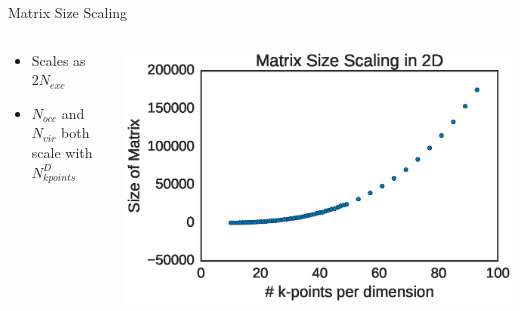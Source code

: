\documentclass[10pt]{beamer}
\begin{document}
{{{{{{{{{{{{{{{{{\begin{frame}{Matrix Size Scaling}
	\begin{columns}[c] %
		\begin{column}{.4\textwidth}
			\begin{itemize}
				\item {Scales as $2N_{exc}$}
				\item {$N_{occ}$ and $N_{vir}$ both scale with $N_{kpoints}^D$}
			\end{itemize}
		\end{column}
		\hfill
		\begin{column}{0.6\textwidth}
		    \begin{overprint}
			    \includegraphics[width=\linewidth]{../images/matscale.eps}

			\end{overprint}
		\end{column}
	\end{columns}
\end{frame}


}}}}}}}}}}}}}}}}}
\end{document}
